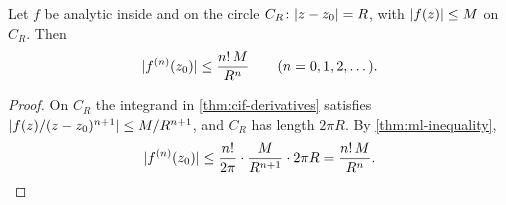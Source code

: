 \begin{theorem}\label{thm:cauchy-estimates}
  Let $f$ be analytic inside and on the circle $C_R \colon \lvert z - z_0\rvert = R$,
  with $\lvert f(z)\rvert \leq M$ on $C_R$. Then
  \[
    \lvert f^{(n)}(z_0)\rvert \leq \frac{n! \, M}{R^n}
    \qquad (n = 0, 1, 2, \dots).
  \]
\end{theorem}

\begin{proof}
  On $C_R$ the integrand in \cref{thm:cif-derivatives} satisfies
  $\lvert f(z) / (z - z_0)^{n+1}\rvert \leq M / R^{n+1}$, and $C_R$ has length
  $2\pi R$. By \cref{thm:ml-inequality},
  \[
    \lvert f^{(n)}(z_0)\rvert
    \leq \frac{n!}{2\pi} \cdot \frac{M}{R^{n+1}} \cdot 2\pi R
    = \frac{n! \, M}{R^n}. \qedhere
  \]
\end{proof}
